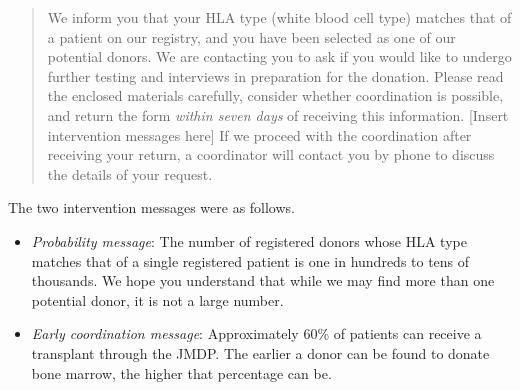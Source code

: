 \documentclass[12pt, a4paper]{article}
\providecommand{\tightlist}{%
  \setlength{\itemsep}{0pt}\setlength{\parskip}{0pt}}
\begin{document}
\begin{quote}
We inform you that your HLA type (white blood cell type) matches that of a patient on our registry, and you have been selected as one of our potential donors. We are contacting you to ask if you would like to undergo further testing and interviews in preparation for the donation. Please read the enclosed materials carefully, consider whether coordination is possible, and return the form \emph{within seven days} of receiving this information. {[}Insert intervention messages here{]} If we proceed with the coordination after receiving your return, a coordinator will contact you by phone to discuss the details of your request.
\end{quote}

The two intervention messages were as follows.

\begin{itemize}
\tightlist
\item
  \emph{Probability message}: The number of registered donors whose HLA type matches that of a single registered patient is one in hundreds to tens of thousands. We hope you understand that while we may find more than one potential donor, it is not a large number.
\item
  \emph{Early coordination message}: Approximately 60\% of patients can receive a transplant through the JMDP. The earlier a donor can be found to donate bone marrow, the higher that percentage can be.
\end{itemize}

\clearpage


\end{document}
